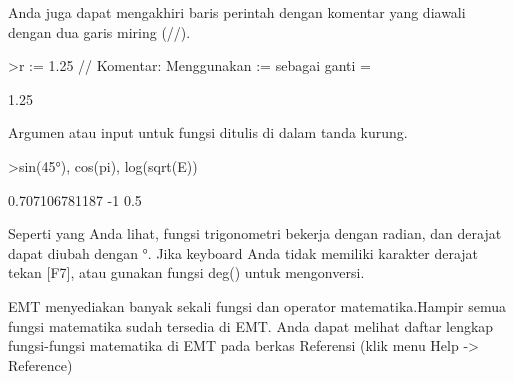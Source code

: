 \documentclass[a4paper,10pt]{article}
\begin{document}
\begin{eulernotebook}
\begin{eulercomment}
\begin{eulercomment}
\begin{eulercomment}
Anda juga dapat mengakhiri baris perintah dengan komentar yang diawali dengan dua
garis miring (//).
\end{eulercomment}
\begin{eulerprompt}
>r := 1.25 // Komentar: Menggunakan  := sebagai ganti =
\end{eulerprompt}
\begin{euleroutput}
  1.25
\end{euleroutput}
\begin{eulercomment}
Argumen atau input untuk fungsi ditulis di dalam tanda kurung.
\end{eulercomment}
\begin{eulerprompt}
>sin(45°), cos(pi), log(sqrt(E))
\end{eulerprompt}
\begin{euleroutput}
  0.707106781187
  -1
  0.5
\end{euleroutput}
\begin{eulercomment}
Seperti yang Anda lihat, fungsi trigonometri bekerja dengan radian, dan derajat
dapat diubah dengan °. Jika keyboard Anda tidak memiliki karakter derajat tekan
[F7], atau gunakan fungsi deg() untuk mengonversi.

EMT menyediakan banyak sekali fungsi dan operator matematika.Hampir semua fungsi
matematika sudah tersedia di EMT. Anda dapat melihat daftar lengkap fungsi-fungsi
matematika di EMT pada berkas Referensi (klik menu Help -\textgreater{} Reference)


\end{eulercomment}
\end{eulercomment}
\end{eulercomment}
\end{eulernotebook}
\end{document}
